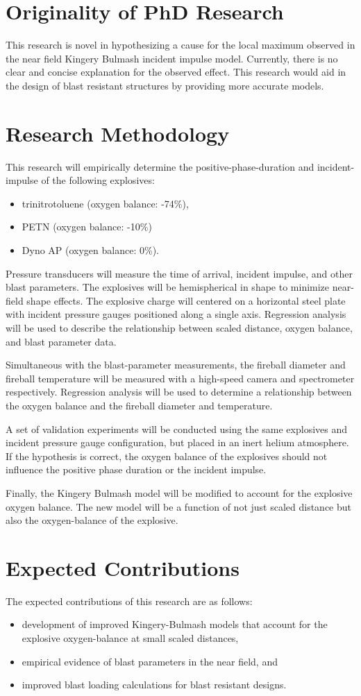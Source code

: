 \section{Originality of PhD Research}
This research is novel in hypothesizing a cause for the local maximum observed in the near field Kingery Bulmash incident impulse model. Currently, there is no clear and concise explanation for the observed effect. This research would aid in the design of blast resistant structures by providing more accurate models.
\section{Research Methodology}
This research will empirically determine the positive-phase-duration and incident-impulse of the following explosives:
\begin{itemize}
    \item trinitrotoluene (oxygen balance: -74\%),
    \item PETN (oxygen balance: -10\%)
    \item Dyno AP (oxygen balance: 0\%).
\end{itemize}
Pressure transducers will measure the time of arrival, incident impulse, and other blast parameters.  The explosives will be hemispherical in shape to minimize near-field shape effects.  The explosive charge will centered on a horizontal steel plate with incident pressure gauges positioned along a single axis.  Regression analysis will be used to describe the relationship between scaled distance, oxygen balance, and blast parameter data.

Simultaneous with the blast-parameter measurements, the fireball diameter and fireball temperature will be measured with a high-speed camera and spectrometer respectively.  Regression analysis will be used to determine a relationship between the oxygen balance and the fireball diameter and temperature.

A set of validation experiments will be conducted using the same explosives and incident pressure gauge configuration, but placed in an inert helium atmosphere.  If the hypothesis is correct, the oxygen balance of the explosives should not influence the positive phase duration or the incident impulse.

Finally, the Kingery Bulmash model will be modified to account for the explosive oxygen balance.  The new model will be a function of not just scaled distance but also the oxygen-balance of the explosive.
\section{Expected Contributions}
The expected contributions of this research are as follows:
\begin{itemize}
    \item development of improved Kingery-Bulmash models that account for the explosive oxygen-balance at small scaled distances,
    \item empirical evidence of blast parameters in the near field, and
    \item improved blast loading calculations for blast resistant designs.
\end{itemize}

